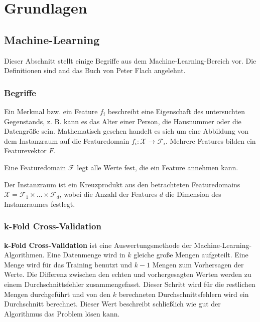 
\section{Grundlagen}
\subsection{Machine-Learning}
Dieser Abschnitt stellt einige Begriffe aus dem Machine-Learning-Bereich vor. 
Die Definitionen sind and das Buch von Peter Flach \cite{Flach:2012:MLA:2490546} angelehnt.
\subsubsection{Begriffe}

\begin{term}
Ein Merkmal bzw. ein Feature $f_i$ beschreibt eine Eigenschaft des untersuchten Gegenstands, z. B. kann es das Alter einer Person, die Hausnummer oder die Datengröße sein. 
Mathematisch gesehen handelt es sich um eine Abbildung von dem Instanzraum auf die Featuredomain $f_i : \mathscr{X} \rightarrow \mathscr{F}_i$. 
Mehrere Features bilden ein Featurevektor $F$. 
\end{term}

\begin{term}[Featuredomain]
	Eine Featuredomain $\mathscr{F}$ legt alle Werte fest, die ein Feature annehmen kann. 
\end{term}

\begin{term}[Instanzraum]
Der Instanzraum ist ein Kreuzprodukt aus den betrachteten Featuredomains $\mathscr{X} = \mathscr{F}_1 \times \dots \times \mathscr{F}_d$, wobei die Anzahl der Features $d$ die Dimension des Instanzraumes festlegt.
\end{term}


\subsubsection{k-Fold Cross-Validation}
\textbf{k-Fold Cross-Validation} ist eine Auswertungsmethode der Machine-Learning-Algorithmen. 
Eine Datenmenge wird in $k$ gleiche große Mengen aufgeteilt. 
Eine Menge wird für das Training benutzt und $k-1$ Mengen zum Vorhersagen der Werte. 
Die Differenz zwischen den echten und vorhergesagten Werten werden zu einem Durchschnittsfehler zusammengefasst. 
Dieser Schritt wird für die restlichen Mengen durchgeführt und von den $k$ berechneten Durchschnittsfehlern wird ein Durchschnitt berechnet. 
Dieser Wert beschreibt schließlich wie gut der Algorithmus das Problem lösen kann.


